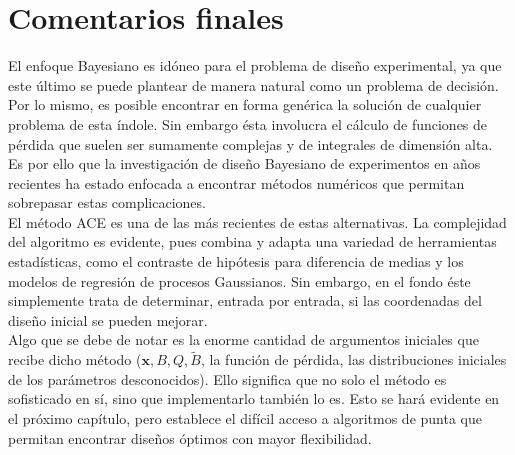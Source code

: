 \section{Comentarios finales}


El enfoque Bayesiano es idóneo para el problema de diseño experimental, ya que este último se puede plantear de manera natural como un problema de decisión. Por lo mismo, es posible encontrar en forma genérica la solución de cualquier problema de esta índole. Sin embargo ésta involucra el cálculo de funciones de pérdida que suelen ser sumamente complejas y de integrales de dimensión alta. Es por ello que la investigación de diseño Bayesiano de experimentos en años recientes ha estado enfocada a encontrar métodos numéricos que permitan sobrepasar estas complicaciones.\\


El método ACE es una de las más recientes de estas alternativas. La complejidad del algoritmo es evidente, pues combina y adapta una variedad de herramientas estadísticas, como el contraste de hipótesis para diferencia de medias y los modelos de regresión de procesos Gaussianos. Sin embargo, en el fondo éste simplemente trata de determinar, entrada por entrada, si las coordenadas del diseño inicial se pueden mejorar. \\



Algo que se debe de notar es la enorme cantidad de argumentos iniciales que recibe dicho método ($\mathbf{x}, B, Q, \tilde{B}$, la función de pérdida, las distribuciones iniciales de los parámetros desconocidos). Ello significa que no solo el método es sofisticado en sí, sino que implementarlo también lo es. Esto se hará evidente en el próximo capítulo, pero establece el difícil acceso a algoritmos de punta que permitan encontrar diseños óptimos con mayor flexibilidad.







